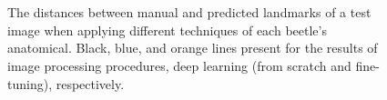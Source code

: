 \documentclass[review]{elsarticle}
\begin{document}
\begin{figure}[htbp]
    \centering
    ~~
	\\
    ~~
	\\
    \caption{The distances between manual and predicted landmarks of a test image when applying different techniques of each beetle's anatomical. Black, blue, and orange lines present for the results of image processing procedures, deep learning (from scratch and fine-tuning), respectively. }
    \label{fig0015parts}
\end{figure}
\end{document}
